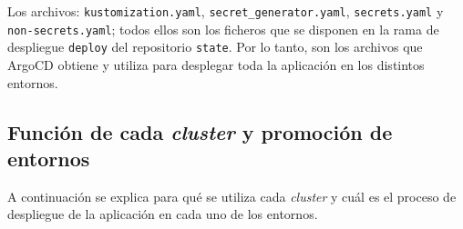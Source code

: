 Los archivos: \texttt{kustomization.yaml}, \texttt{secret\_generator.yaml}, \texttt{secrets.yaml} y \texttt{non-secrets.yaml}; todos ellos son los ficheros que se disponen en la rama de despliegue \texttt{deploy} del repositorio \texttt{state}. Por lo tanto, son los archivos que ArgoCD obtiene y utiliza para desplegar toda la aplicación en los distintos entornos.

\subsection*{Función de cada \textit{cluster} y promoción de entornos}

A continuación se explica para qué se utiliza cada \textit{cluster} y cuál es el proceso de despliegue de la aplicación en cada uno de los entornos.

